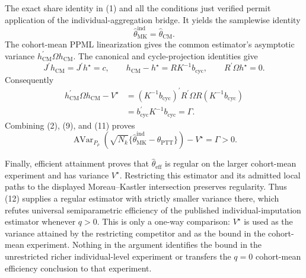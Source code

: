 The exact share identity in (1) and all the conditions just verified permit application of the individual-aggregation bridge.  It yields the samplewise identity
\[
\widehat\theta_{\mathrm{MK}}^{\mathrm{ind}}
=\widehat\theta_{\mathrm{CM}}.                                         \tag{9}
\]
The cohort-mean PPML linearization gives the common estimator's asymptotic variance
\(h_{\mathrm{CM}}^{\prime}\Omega h_{\mathrm{CM}}\).  The canonical and cycle-projection identities give
\[
J^{\prime}h_{\mathrm{CM}}=J^{\prime}h^{\star}=c,
\qquad
h_{\mathrm{CM}}-h^{\star}=RK^{-1}b_{\mathrm{cyc}},
\qquad
R^{\prime}\Omega h^{\star}=0.                                         \tag{10}
\]
Consequently
\[
\begin{aligned}
h_{\mathrm{CM}}^{\prime}\Omega h_{\mathrm{CM}}-V^{\star}
&=(K^{-1}b_{\mathrm{cyc}})^{\prime}
 R^{\prime}\Omega R(K^{-1}b_{\mathrm{cyc}})\\
&=b_{\mathrm{cyc}}^{\prime}K^{-1}b_{\mathrm{cyc}}
=\Gamma.                                                               \tag{11}
\end{aligned}
\]
Combining (2), (9), and (11) proves
\[
\operatorname{AVar}_{P_\rho}\!\left(
\sqrt{N_k}\{\widehat\theta_{\mathrm{MK}}^{\mathrm{ind}}
-\theta_{\mathrm{PTT}}\}\right)-V^{\star}
=\Gamma>0.                                                              \tag{12}
\]

Finally, efficient attainment proves that
\(\widehat\theta_{\mathrm{eff}}\) is regular on the larger cohort-mean experiment and has variance \(V^{\star}\).  Restricting this estimator and its admitted local paths to the displayed Moreau--Kastler intersection preserves regularity.  Thus (12) supplies a regular estimator with strictly smaller variance there, which refutes universal semiparametric efficiency of the published individual-imputation estimator whenever \(q>0\).  This is only a one-way comparison: \(V^{\star}\) is used as the variance attained by the restricting competitor and as the bound in the cohort-mean experiment.  Nothing in the argument identifies the bound in the unrestricted richer individual-level experiment or transfers the \(q=0\) cohort-mean efficiency conclusion to that experiment.
